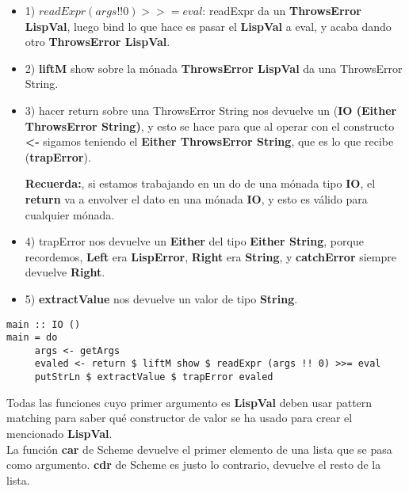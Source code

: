 \begin{itemize}

\item 1) $readExpr (args !! 0) >>= eval$: readExpr da un \textbf{ThrowsError LispVal}, luego bind lo que hace es pasar el \textbf{LispVal} a eval, y acaba dando otro \textbf{ThrowsError LispVal}.

\item 2) \textbf{liftM} show sobre la m\'onada \textbf{ThrowsError LispVal} da una ThrowsError String.

\item 3) hacer return sobre una ThrowsError String nos devuelve un (\textbf{IO (Either ThrowsError String)}, y esto se hace para que al operar con el constructo \textbf{<-} sigamos teniendo el \textbf{Either ThrowsError String}, que es lo que recibe (\textbf{trapError}).

\textbf{Recuerda:}, si estamos trabajando en un do de una m\'onada tipo \textbf{IO}, el \textbf{return} va a envolver el dato en una m\'onada \textbf{IO}, y esto es v\'alido para cualquier m\'onada.

\item 4) trapError nos devuelve un \textbf{Either} del tipo \textbf{Either String}, porque recordemos, \textbf{Left} era \textbf{LispError}, \textbf{Right} era \textbf{String}, y \textbf{catchError} siempre devuelve \textbf{Right}.

\item 5) \textbf{extractValue} nos devuelve un valor de tipo \textbf{String}.
\end{itemize}

\begin{minipage}{\linewidth}
\begin{small}
\begin{lstlisting}[frame=single]
main :: IO ()
main = do
     args <- getArgs
     evaled <- return $ liftM show $ readExpr (args !! 0) >>= eval
     putStrLn $ extractValue $ trapError evaled
\end{lstlisting}
\end{small}
\end{minipage}

Todas las funciones cuyo primer argumento es \textbf{LispVal} deben usar pattern matching para saber qu\'e constructor de valor se ha usado para crear el mencionado \textbf{LispVal}.\\

La funci\'on \textbf{car} de Scheme devuelve el primer elemento de una lista que se pasa como argumento. \textbf{cdr} de Scheme es justo lo contrario, devuelve el resto de la lista.\\

